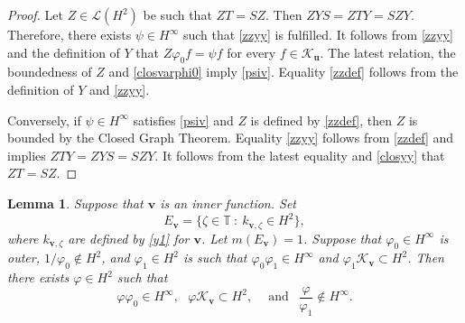 \documentclass[a4paper,oneside,11pt]{amsart}
\numberwithin{equation}{section}
\theoremstyle{plain}
\newtheorem{lemma}[theorem]{Lemma}
\theoremstyle{definition}
\begin{document}
\begin{proof}
Let $Z\in\mathcal L(H^2)$ be such that $ZT=SZ$. Then $ZYS=ZTY=SZY$. Therefore, there exists $\psi\in H^\infty$ such that \eqref{zzyy} is fulfilled. It follows from \eqref{zzyy}  and the definition of $Y$ that $Z\varphi_0f=\psi f$ for every $f\in \mathcal K_{\mathbf u}$. The latest relation, the boundedness of $Z$ and  \eqref{closvarphi0} imply  \eqref{psiv}. 
Equality \eqref{zzdef} follows from the definition of $Y$ and \eqref{zzyy}. 

Conversely, if $\psi\in H^\infty$  satisfies \eqref{psiv} and  $Z$ is defined by \eqref{zzdef}, 
then $Z$ is bounded by the Closed Graph Theorem.   Equality \eqref{zzyy} follows  from \eqref{zzdef}  and implies  $ZTY=ZYS=SZY$. 
 It follows from the latest equality and \eqref{closyy} that $ZT=SZ$.
\end{proof}

\begin{lemma}\label{lemssmain} Suppose that $\mathbf v$ is an inner function. Set  
\begin{equation}\label{eev} E_{\mathbf v}=\{\zeta\in\mathbb T\ : \ k_{\mathbf v,\zeta}\in H^2\},
\end{equation}
where $k_{\mathbf v,\zeta}$ are defined by \eqref{y1} for $\mathbf v$. 
Let $m(E_{\mathbf v})=1$. Suppose that $\varphi_0\in H^\infty$ is outer, 
 $1/\varphi_0\not\in H^2$,
 and $\varphi_1\in H^2$ is such that $\varphi_0\varphi_1\in H^\infty$ and 
$\varphi_1\mathcal K_{\mathbf v}\subset H^2$.
Then there exists $\varphi\in H^2$ such that 
$$\varphi\varphi_0\in H^\infty, \ \ \ \varphi\mathcal K_{\mathbf v}\subset H^2, \ \ \ 
 \ \text{ and } \ \ \frac{\varphi}{\varphi_1}\not\in H^\infty.$$
\end{lemma}
\end{document}
